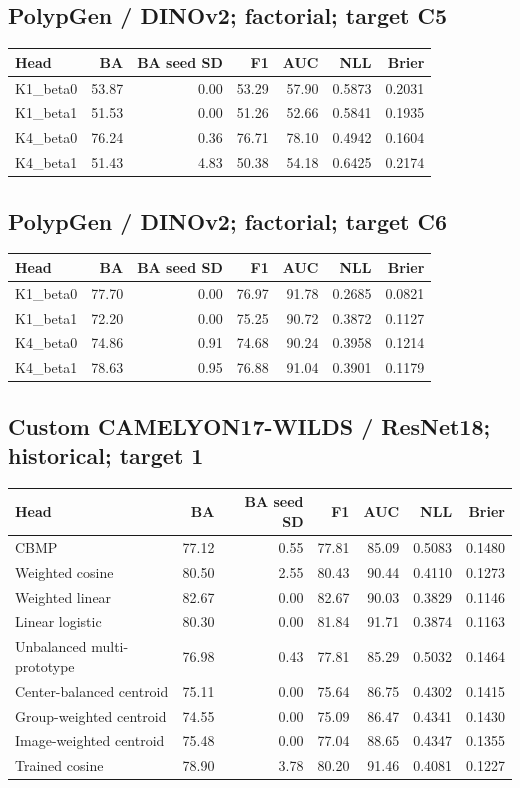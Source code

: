 \subsection*{PolypGen / DINOv2; factorial; target C5}
\begingroup\small\setlength{\tabcolsep}{3pt}
\begin{longtable}{lrrrrrr}
\toprule Head & BA & BA seed SD & F1 & AUC & NLL & Brier \\
\midrule
K1\_beta0 & 53.87 & 0.00 & 53.29 & 57.90 & 0.5873 & 0.2031 \\
K1\_beta1 & 51.53 & 0.00 & 51.26 & 52.66 & 0.5841 & 0.1935 \\
K4\_beta0 & 76.24 & 0.36 & 76.71 & 78.10 & 0.4942 & 0.1604 \\
K4\_beta1 & 51.43 & 4.83 & 50.38 & 54.18 & 0.6425 & 0.2174 \\
\bottomrule
\end{longtable}
\endgroup
\subsection*{PolypGen / DINOv2; factorial; target C6}
\begingroup\small\setlength{\tabcolsep}{3pt}
\begin{longtable}{lrrrrrr}
\toprule Head & BA & BA seed SD & F1 & AUC & NLL & Brier \\
\midrule
K1\_beta0 & 77.70 & 0.00 & 76.97 & 91.78 & 0.2685 & 0.0821 \\
K1\_beta1 & 72.20 & 0.00 & 75.25 & 90.72 & 0.3872 & 0.1127 \\
K4\_beta0 & 74.86 & 0.91 & 74.68 & 90.24 & 0.3958 & 0.1214 \\
K4\_beta1 & 78.63 & 0.95 & 76.88 & 91.04 & 0.3901 & 0.1179 \\
\bottomrule
\end{longtable}
\endgroup
\subsection*{Custom CAMELYON17-WILDS / ResNet18; historical; target 1}
\begingroup\small\setlength{\tabcolsep}{3pt}
\begin{longtable}{lrrrrrr}
\toprule Head & BA & BA seed SD & F1 & AUC & NLL & Brier \\
\midrule
CBMP & 77.12 & 0.55 & 77.81 & 85.09 & 0.5083 & 0.1480 \\
Weighted cosine & 80.50 & 2.55 & 80.43 & 90.44 & 0.4110 & 0.1273 \\
Weighted linear & 82.67 & 0.00 & 82.67 & 90.03 & 0.3829 & 0.1146 \\
Linear logistic & 80.30 & 0.00 & 81.84 & 91.71 & 0.3874 & 0.1163 \\
Unbalanced multi-prototype & 76.98 & 0.43 & 77.81 & 85.29 & 0.5032 & 0.1464 \\
Center-balanced centroid & 75.11 & 0.00 & 75.64 & 86.75 & 0.4302 & 0.1415 \\
Group-weighted centroid & 74.55 & 0.00 & 75.09 & 86.47 & 0.4341 & 0.1430 \\
Image-weighted centroid & 75.48 & 0.00 & 77.04 & 88.65 & 0.4347 & 0.1355 \\
Trained cosine & 78.90 & 3.78 & 80.20 & 91.46 & 0.4081 & 0.1227 \\
\bottomrule
\end{longtable}
\endgroup
